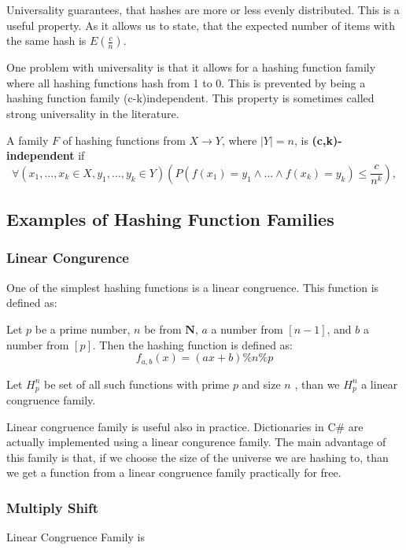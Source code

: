 Universality guarantees, that hashes are more or less evenly distributed. This is a useful property. As it allows us to state, that the expected number of items with the same hash is $E(\frac{c}{n})$. 

One problem with universality is that it allows for a hashing function family where all hashing functions hash from 1 to 0. This is prevented by being a hashing function family (c-k)independent. This property is sometimes called strong universality in the literature.

\begin{defn}
A family \( F \) of hashing functions from \( X \rightarrow Y \), where \( |Y| = n \), is \textbf{(c,k)-independent} if 
\[ \forall (x_1, \dots, x_k \in X, y_1, \dots, y_k \in Y) \left( P\left(f(x_1) = y_1 \land \dots \land f(x_k) = y_k\right) \leq \frac{c}{n^k} \right), \]
\end{defn}
\subsection{Examples of Hashing Function Families}

\subsubsection{Linear Congurence}
One of the simplest hashing functions is a linear congruence. This function is defined as:
\begin{defn}
    Let \( p \) be a prime number, \(n\)  be from $\mathbf{N}$,  \( a \) a number from \([n-1]\), and \( b \) a number from \([p]\). Then the hashing function is defined as:
    \[ f_{a,b}(x) = (ax + b) \% n \% p\]

    Let $H_p^n$ be set of all such functions with prime $p$ and size $n$ , than we $H_p^n$ a linear congruence family.
\end{defn}
 
Linear congruence family is useful also in practice. Dictionaries in C\# are actually implemented using a linear congurence family. The main advantage of this family is that, if we choose the size of the universe we are hashing to, than we get a function from a linear congruence family practically for free.

\subsubsection{Multiply Shift}

\begin{defn}
    Linear Congruence Family is 

\end{defn}